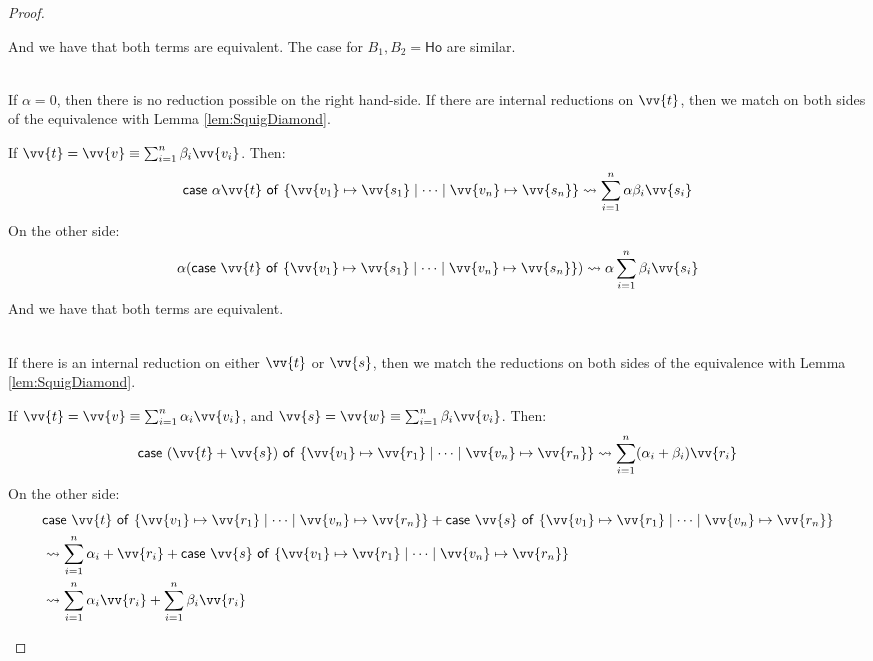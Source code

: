\documentclass[runningheads,orivec,envcountsame,envcountsect]{llncs}
\newcommand\AbsBasis{\ensuremath{\mathsf{Ho}}}
\def\gencase#1#2#3#4#5{\ensuremath{\mathsf{case}~#1~\mathsf{of}~\{#2\mapsto #4 \mid \dotsb \mid #3\mapsto #5\}}}
\def\lraneq{\rightsquigarrow}
\begin{document}
\begin{proof}
\begin{description}
      And we have that both terms are equivalent. The case for $B_1,B_2=\AbsBasis$ are similar.

    \item[\parbox{.55\linewidth}{\begin{align*}
      &\gencase{\alpha \vv{t}}{\vv{v_1}}{\vv{v_n}}{\vv{s_1}}{\vv{s_n}}\equiv\\
      &\alpha(\gencase{\vv{t}}{\vv{v_1}}{\vv{v_n}}{\vv{s_1}}{\vv{s_n}})
    \end{align*}}:] \hfill\\
    
    If $\alpha=0$, then there is no reduction possible on the right hand-side. If there are internal reductions on $\vv{t}$, then we match on both sides of the equivalence with Lemma \ref{lem:SquigDiamond}.
    
    If $\vv{t}=\vv{v}\equiv\sum_{i=1}^n\beta_i \vv{v_i}$. Then:
    \begin{align*}
      \gencase{\alpha \vv{t}}{\vv{v_1}}{\vv{v_n}}{\vv{s_1}}{\vv{s_n}}\lraneq \sum_{i=1}^n\alpha\beta_i \vv{s_i}
    \end{align*}
    On the other side:
    \begin{align*}
      \alpha(\gencase{\vv{t}}{\vv{v_1}}{\vv{v_n}}{\vv{s_1}}{\vv{s_n}})\lraneq \alpha\sum_{i=1}^n\beta_i \vv{s_i}
    \end{align*}
    And we have that both terms are equivalent.

    \item[\parbox{.55\linewidth}{\begin{align*}
      &\gencase{(\vv{t}+\vv{s})}{\vv{v_1}}{\vv{v_n}}{\vv{r_1}}{\vv{r_n}}\equiv\\ 
      &\gencase{\vv{t}}{\vv{v_1}}{\vv{v_n}}{\vv{r_1}}{\vv{r_n}}+\\
      &\gencase{\vv{s}}{\vv{v_1}}{\vv{v_n}}{\vv{r_1}}{\vv{r_n}}  
    \end{align*}}:]\hfill\\

    If there is an internal reduction on either $\vv{t}$ or $\vv{s}$, then we match the reductions on both sides of the equivalence with Lemma \ref{lem:SquigDiamond}.

    If $\vv{t}=\vv{v}\equiv\sum_{i=1}^n\alpha_i \vv{v_i}$, and $\vv{s}=\vv{w}\equiv\sum_{i=1}^n\beta_i \vv{v_i}$. Then:
    \begin{align*}
      \gencase{(\vv{t}+\vv{s})}{\vv{v_1}}{\vv{v_n}}{\vv{r_1}}{\vv{r_n}}\lraneq \sum_{i=1}^n (\alpha_i+\beta_i) \vv{r_i}
    \end{align*}
    On the other side:
    \begin{align*}
      &\gencase{\vv{t}}{\vv{v_1}}{\vv{v_n}}{\vv{r_1}}{\vv{r_n}}+\gencase{\vv{s}}{\vv{v_1}}{\vv{v_n}}{\vv{r_1}}{\vv{r_n}}\\
      &\lraneq \sum_{i=1}^n \alpha_i+ \vv{r_i} + \gencase{\vv{s}}{\vv{v_1}}{\vv{v_n}}{\vv{r_1}}{\vv{r_n}}\\
      &\lraneq \sum_{i=1}^n \alpha_i \vv{r_i} + \sum_{i=1}^n \beta_i \vv{r_i}\\
    \end{align*}


\end{description}
\end{proof}
\end{document}
